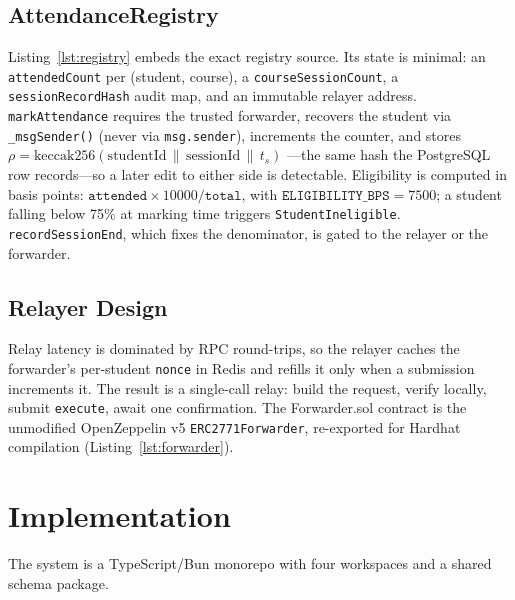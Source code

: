\documentclass[conference]{IEEEtran}
\begin{document}
\subsection{AttendanceRegistry}
Listing~\ref{lst:registry} embeds the exact registry source. Its state is
minimal: an \texttt{attendedCount} per (student, course), a
\texttt{courseSessionCount}, a \texttt{sessionRecordHash} audit map, and an
immutable relayer address. \texttt{markAttendance} requires the trusted
forwarder, recovers the student via \texttt{\_msgSender()} (never via
\texttt{msg.sender}), increments the counter, and stores
$\rho=\mathrm{keccak256}(\mathrm{studentId}\,\|\,\mathrm{sessionId}\,\|\,t_s)$
---the same hash the PostgreSQL row records---so a later edit to either side
is detectable. Eligibility is computed in basis points:
$\texttt{attended}\times10000/\texttt{total}$, with $\texttt{ELIGIBILITY\_BPS}
= 7500$; a student falling below 75\% at marking time triggers
\texttt{StudentIneligible}. \texttt{recordSessionEnd}, which fixes the
denominator, is gated to the relayer or the forwarder.

\subsection{Relayer Design}
Relay latency is dominated by RPC round-trips, so the relayer caches the
forwarder's per-student \texttt{nonce} in Redis and refills it only when a
submission increments it. The result is a single-call relay: build the
request, verify locally, submit \texttt{execute}, await one confirmation. The
Forwarder.sol contract is the unmodified OpenZeppelin v5
\texttt{ERC2771Forwarder}, re-exported for Hardhat compilation
(Listing~\ref{lst:forwarder}).


\label{lst:registry}


\label{lst:forwarder}

\section{Implementation}
The system is a TypeScript/Bun monorepo with four workspaces and a shared
schema package.
\end{document}
